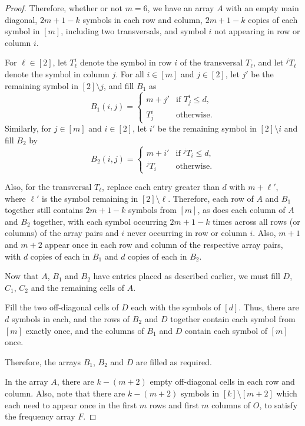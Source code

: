 \documentclass[preprint,nonatbib]{elsarticle}
\theoremstyle{definition}
\numberwithin{equation}{section}
\begin{document}
\begin{proof}
    Therefore, whether or not $m=6$, we have an array $A$ with an empty main diagonal, $2m+1-k$ symbols in each row and column, $2m+1-k$ copies of each symbol in $[m]$, including two transversals, and symbol $i$ not appearing in row or column $i$.

    For $\ell\in[2]$, let $T_\ell^i$ denote the symbol in row $i$ of the transversal $T_\ell$, and let $^jT_\ell$ denote the symbol in column $j$. For all $i\in[m]$ and $j\in[2]$, let $j'$ be the remaining symbol in $[2]\setminus j$, and fill $B_1$ as
    $$B_1(i,j) = \begin{cases}
        m+j' & \text{if $T_j^i\leq d$,}\\
        T_j^i & \text{otherwise.}
    \end{cases}$$
    Similarly, for $j\in[m]$ and $i\in[2]$, let $i'$ be the remaining symbol in $[2]\setminus i$ and fill $B_2$ by
    $$B_2(i,j) = \begin{cases}
        m+i' & \text{if $^jT_i\leq d$,}\\
        ^jT_i & \text{otherwise.}
    \end{cases}$$
    
    Also, for the transversal $T_\ell$, replace each entry greater than $d$ with $m+\ell'$, where $\ell'$ is the symbol remaining in $[2]\setminus\ell$. Therefore, each row of $A$ and $B_1$ together still contains $2m+1-k$ symbols from $[m]$, as does each column of $A$ and $B_2$ together, with each symbol occurring $2m+1-k$ times across all rows (or columns) of the array pairs and $i$ never occurring in row or column $i$. Also, $m+1$ and $m+2$ appear once in each row and column of the respective array pairs, with $d$ copies of each in $B_1$ and $d$ copies of each in $B_2$.

    Now that $A$, $B_1$ and $B_2$ have entries placed as described earlier, we must fill $D$, $C_1$, $C_2$ and the remaining cells of $A$.

    Fill the two off-diagonal cells of $D$ each with the symbols of $[d]$. Thus, there are $d$ symbols in each, and the rows of $B_2$ and $D$ together contain each symbol from $[m]$ exactly once, and the columns of $B_1$ and $D$ contain each symbol of $[m]$ once.

    Therefore, the arrays $B_1$, $B_2$ and $D$ are filled as required.

    In the array $A$, there are $k-(m+2)$ empty off-diagonal cells in each row and column. Also, note that there are $k-(m+2)$ symbols in $[k]\setminus[m+2]$ which each need to appear once in the first $m$ rows and first $m$ columns of $O$, to satisfy the frequency array $F$.
    

\end{proof}
\end{document}
